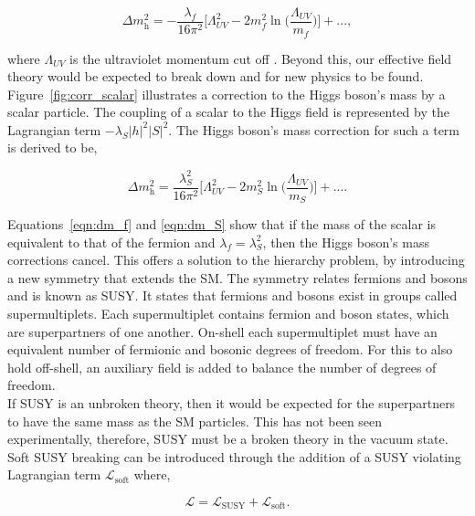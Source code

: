 \begin{equation}
\Delta m_{\text{h}}^{2} =  -\frac{\lambda_f}{16\pi^2}\Big[\Lambda_{UV}^{2} -2m_{f}^{2} \ln\Big(\frac{\Lambda_{UV}}{m_f}\Big) \Big] + ... ,
\label{eqn:dm_f}
\end{equation}

where \(\Lambda_{UV}\) is the ultraviolet momentum cut off \cite{SUSY_Primer}.
Beyond this, our effective field theory would be expected to break down and for new physics to be found. \\

Figure~\ref{fig:corr_scalar} illustrates a correction to the Higgs boson's mass by a scalar particle. 
The coupling of a scalar to the Higgs field is represented by the Lagrangian term $-\lambda_S |h|^2 |S|^2$. 
The Higgs boson's mass correction for such a term is derived to be,

\begin{equation}
    \Delta m_{\text{h}}^{2} =  \frac{\lambda_{S}^{2}}{16\pi^2}\Big[\Lambda_{UV}^{2} -2m_{S}^{2} \ln\Big(\frac{\Lambda_{UV}}{m_S}\Big) \Big] + ... .
    \label{eqn:dm_S}
\end{equation}

Equations~\ref{eqn:dm_f} and \ref{eqn:dm_S} show that if the mass of the scalar is equivalent to that of the fermion and $\lambda_f = \lambda_{S}^{2}$, then the Higgs boson's mass corrections cancel. 
This offers a solution to the hierarchy problem, by introducing a new symmetry that extends the \ac{SM}. 
The symmetry relates fermions and bosons and is known as \ac{SUSY}. 
It states that fermions and bosons exist in groups called supermultiplets. 
Each supermultiplet contains fermion and boson states, which are superpartners of one another. 
On-shell each supermultiplet must have an equivalent number of fermionic and bosonic degrees of freedom. 
For this to also hold off-shell, an auxiliary field is added to balance the number of degrees of freedom. \\

If \ac{SUSY} is an unbroken theory, then it would be expected for the superpartners to have the same mass as the \ac{SM} particles. 
This has not been seen experimentally, therefore, \ac{SUSY} must be a broken theory in the vacuum state. 
Soft \ac{SUSY} breaking can be introduced through the addition of a \ac{SUSY} violating Lagrangian term $\mathcal{L}_{\text{soft}}$ where,

\begin{equation}
    \mathcal{L} = \mathcal{L}_{\text{SUSY}} + \mathcal{L}_{\text{soft}}.
\end{equation}

